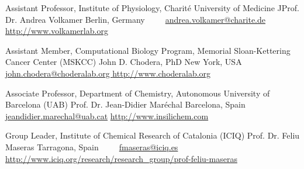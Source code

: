 


\begin{cventries}

    \cventry
        {Assistant Professor, Institute of Physiology, Charité University of Medicine}
        {JProf. Dr. Andrea Volkamer}
        {Berlin, Germany} %
        {~} %
        {~~ \footnotesize{%
            \href{mailto:andrea.volkamer@charite.de}{\faEnvelope\acvHeaderIconSep andrea.volkamer@charite.de}\acvHeaderSocialSep%
            \href{http://www.volkamerlab.org}{\faGlobe\acvHeaderIconSep http://www.volkamerlab.org}%
        }}

    \cventry
        {Assistant Member, Computational Biology Program, Memorial Sloan-Kettering Cancer Center (MSKCC)}
        {John D. Chodera, PhD}
        {New York, USA} %
        {~} %
        {~~ \footnotesize{%
            \href{mailto:john.chodera@choderalab.org }{\faEnvelope\acvHeaderIconSep john.chodera@choderalab.org }\acvHeaderSocialSep%
            \href{http://www.choderalab.org}{\faGlobe\acvHeaderIconSep http://www.choderalab.org}%
        }}

    \cventry
        {Associate Professor, Department of Chemistry, Autonomous University of Barcelona (UAB)}
        {Prof. Dr. Jean-Didier Maréchal}
        {Barcelona, Spain} %
        {~} %
        {~~ \footnotesize{%
            \href{mailto:jeandidier.marechal@uab.cat}{\faEnvelope\acvHeaderIconSep jeandidier.marechal@uab.cat}\acvHeaderSocialSep%
            \href{http://www.insilichem.com}{\faGlobe\acvHeaderIconSep http://www.insilichem.com}%
        }}

    \cventry
        {Group Leader, Institute of Chemical Research of Catalonia (ICIQ)}
        {Prof. Dr. Feliu Maseras}
        {Tarragona, Spain} %
        {~} %
        {~~ \footnotesize{%
            \href{mailto:fmaseras@iciq.es}{\faEnvelope\acvHeaderIconSep fmaseras@iciq.es}\acvHeaderSocialSep%
            \href{http://www.iciq.org/research/research_group/prof-feliu-maseras/}{\faGlobe\acvHeaderIconSep http://www.iciq.org/research/research\_group/prof-feliu-maseras}
        }}

\end{cventries}